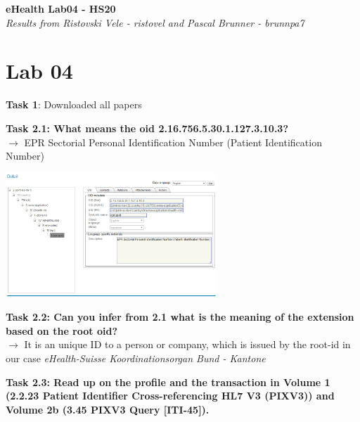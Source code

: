 \documentclass{report}
\newenvironment{Figure}
	{\par\medskip\noindent\minipage{\linewidth}}
	{\endminipage\par\medskip}
\begin{document}
\begin{titlepage}
   \begin{center}
      \Large\textbf{eHealth Lab04 - HS20}\\
      \large\textit{Results from Ristovski Vele - ristovel and Pascal Brunner - brunnpa7}
   \end{center}
\end{titlepage}


\section*{Lab 04}

\textbf{Task 1}: Downloaded all papers

\textbf{Task 2.1: What means the oid 2.16.756.5.30.1.127.3.10.3?}\\
$\rightarrow$ EPR Sectorial Personal Identification Number (Patient Identification Number)
\begin{Figure}
   \centering
    \includegraphics[width=300px]{img/OID.png}
        \label{fig:Result by searching OID}
    \end{Figure}

\textbf{Task 2.2: Can you infer from 2.1 what is the meaning of the extension based on the root oid?}\\
$\rightarrow$ It is an unique ID to a person or company, which is issued by the root-id in our case \textit{eHealth-Suisse Koordinationsorgan Bund - Kantone}

\textbf{Task 2.3: Read up on the profile and the transaction in Volume 1 (2.2.23 Patient Identifier
Cross-referencing HL7 V3 (PIXV3)) and Volume 2b (3.45 PIXV3 Query [ITI-45]).}
\end{document}
